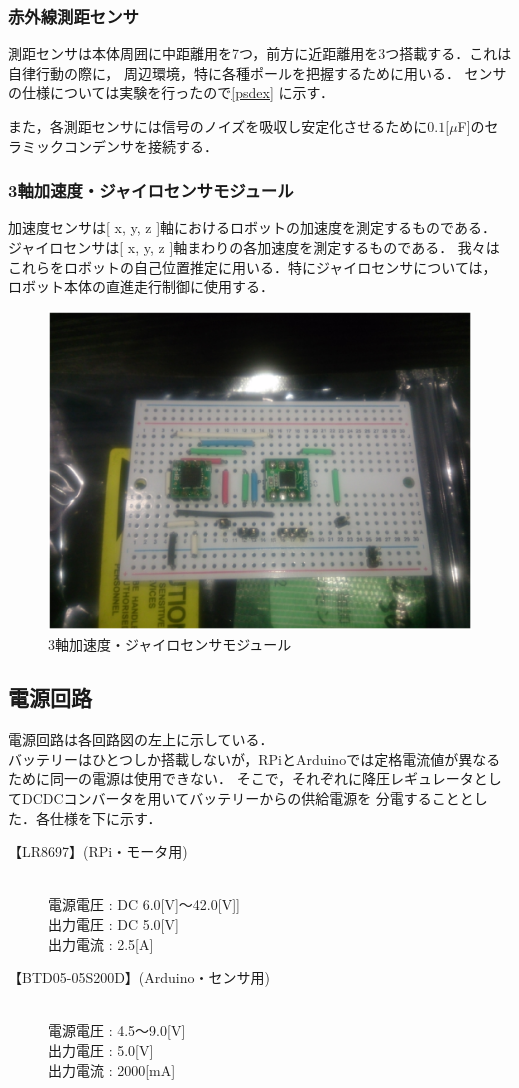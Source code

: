 \documentclass[10pt,a4j]{jarticle}
\begin{document}
\subsubsection{赤外線測距センサ}  
測距センサは本体周囲に中距離用を7つ，前方に近距離用を3つ搭載する．これは自律行動の際に，
周辺環境，特に各種ポールを把握するために用いる． センサの仕様については実験を行ったので\ref{psdex}
 に示す．

また，各測距センサには信号のノイズを吸収し安定化させるために$0.1[\mu $F]のセラミックコンデンサを接続する．

\subsubsection{3軸加速度・ジャイロセンサモジュール}
加速度センサは[ x, y, z ]軸におけるロボットの加速度を測定するものである．
ジャイロセンサは[ x, y, z ]軸まわりの各加速度を測定するものである．
我々はこれらをロボットの自己位置推定に用いる．特にジャイロセンサについては，
ロボット本体の直進走行制御に使用する．
\begin{figure}[b]
 \centering
 \includegraphics[width=0.4\hsize]{./picture/jairo.eps}
 \caption{3軸加速度・ジャイロセンサモジュール}
    \label{jairo}
\end{figure}
\subsection{電源回路}
電源回路は各回路図の左上に示している．\\
バッテリーはひとつしか搭載しないが，RPiとArduinoでは定格電流値が異なるために同一の電源は使用できない．
そこで，それぞれに降圧レギュレータとしてDCDCコンバータを用いてバッテリーからの供給電源を
分電することとした．各仕様を下に示す．


\begin{description}
 \item[【LR8697】(RPi・モータ用)] \mbox{} \\
	    電源電圧 : DC 6.0[V]$〜$42.0[V]] \\
	    出力電圧 : DC 5.0[V] \\
	    出力電流 : 2.5[A]
 \item[【BTD05-05S200D】(Arduino・センサ用)] \mbox{} \\
	    電源電圧 : 4.5$〜$9.0[V] \\
	    出力電圧 : 5.0[V] \\
	    出力電流 : 2000[mA]
\end{description}
\end{document}
